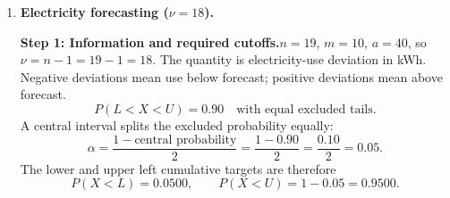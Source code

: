 \begin{enumerate}[leftmargin=*,label=\textbf{\arabic*.},itemsep=12pt,parsep=3pt,topsep=5pt]
\begin{minipage}{\linewidth}
\end{minipage}\par
\par\textbf{Step 6: Comparison errors.}\nopagebreak\enspace \par\noindent\begin{minipage}{\linewidth}
\par\textit{Cutoff comparison.}
\[
E_A=|r_T-r_N|,\qquad E_{Pt}=\frac{100E_A}{|r_T|},\qquad E_{Pn}=\frac{100E_A}{|r_N|}.
\]
Here $r_T$ and $r_N$ are the unrounded contextual cutoffs being compared.
\[
\begin{aligned}
E_A&=|19.552-(18.68)|=0.872\approx 0.87\ \text{minutes},\\
E_{Pt}&=\frac{100|19.552-(18.68)|}{|19.552|}=\frac{100(0.872)}{19.552}\approx 4.46\%,\\
E_{Pn}&=\frac{100|19.552-(18.68)|}{|18.68|}=\frac{100(0.872)}{18.68}\approx 4.67\%.
\end{aligned}
\]
\end{minipage}\par

\par\noindent\begin{minipage}{\linewidth}
\par\textbf{Step 7: Interpretation.}\nopagebreak\enspace About $2.5\%$ of journeys exceed a delay of $19.55$ minutes under $t$, or $18.68$ minutes under normal. Both positive cutoffs mean late arrival; the normal cutoff is about $0.87$ minutes lower.
\end{minipage}\par
\item \begin{minipage}[t]{\linewidth}\textbf{Electricity forecasting ($\nu=18$).}\nopagebreak
\par\textbf{Step 1: Information and required cutoffs.}\nopagebreak\enspace $n=19$, $m=10$, $a=40$, so $\nu=n-1=19-1=18$. The quantity is electricity-use deviation in kWh. Negative deviations mean use below forecast; positive deviations mean above forecast.\[
P(L<X<U)=0.90\quad\text{with equal excluded tails}.
\]
A central interval splits the excluded probability equally:\[
\alpha=\frac{1-\text{central probability}}{2}=\frac{1-0.90}{2}=\frac{0.10}{2}=0.05.
\]
The lower and upper left cumulative targets are therefore\[
P(X<L)=0.0500,\qquad P(X<U)=1-0.05=0.9500.
\]


\end{minipage}
\end{enumerate}
